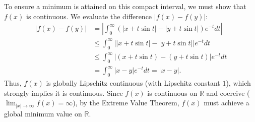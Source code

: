 \documentclass[10pt,a4paper]{article}
\begin{document}
\begin{enumerate}[label=\fbox{\arabic*}]
        To ensure a minimum is attained on this compact interval, we must show that $f(x)$ is continuous. We evaluate the difference $|f(x) - f(y)|$:
        \begin{align*}
          |f(x) - f(y)| &= \left| \int_0^\infty (|x + t \sin t| - |y + t \sin t|) e^{-t} dt \right| \\
          &\le \int_0^\infty \big| |x + t \sin t| - |y + t \sin t| \big| e^{-t} dt \\
          &\le \int_0^\infty |(x + t \sin t) - (y + t \sin t)| e^{-t} dt \\
          &= \int_0^\infty |x - y| e^{-t} dt = |x - y|.
        \end{align*}
        Thus, $f(x)$ is globally Lipschitz continuous (with Lipschitz constant $1$), which strongly implies it is continuous. 
        Since $f(x)$ is continuous on $\mathbb{R}$ and coercive ($\lim_{|x| \to \infty} f(x) = \infty$), by the Extreme Value Theorem, $f(x)$ must achieve a global minimum value on $\mathbb{R}$.


\end{enumerate}
\end{document}
